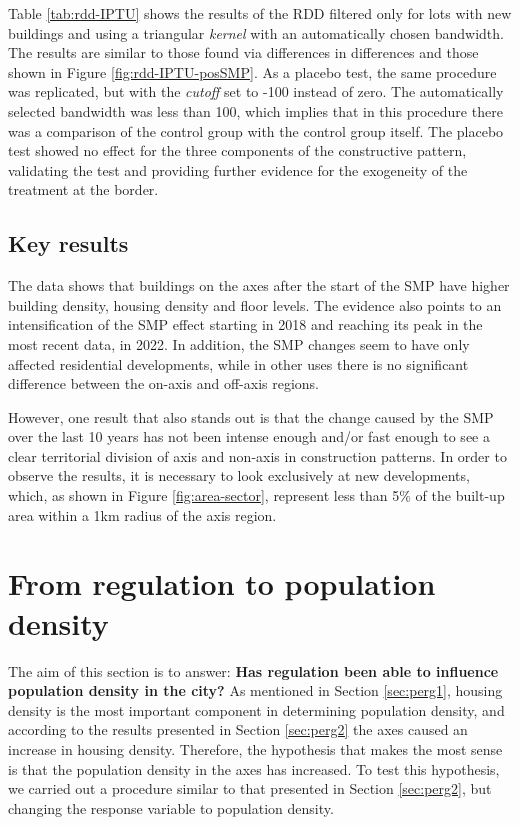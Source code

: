 



Table \ref{tab:rdd-IPTU} shows the results of the RDD filtered only for lots with new buildings and using a triangular \textit{kernel} with an automatically chosen bandwidth. The results are similar to those found via differences in differences and those shown in Figure \ref{fig:rdd-IPTU-posSMP}. As a placebo test, the same procedure was replicated, but with the \textit{cutoff} set to -100 instead of zero. The automatically selected bandwidth was less than 100, which implies that in this procedure there was a comparison of the control group with the control group itself. The placebo test showed no effect for the three components of the constructive pattern, validating the test and providing further evidence for the exogeneity of the treatment at the border.

\subsection{Key results}

The data shows that buildings on the axes after the start of the SMP have higher building density, housing density and floor levels. The evidence also points to an intensification of the SMP effect starting in 2018 and reaching its peak in the most recent data, in 2022. In addition, the SMP changes seem to have only affected residential developments, while in other uses there is no significant difference between the on-axis and off-axis regions.

However, one result that also stands out is that the change caused by the SMP over the last 10 years has not been intense enough and/or fast enough to see a clear territorial division of axis and non-axis in construction patterns. In order to observe the results, it is necessary to look exclusively at new developments, which, as shown in Figure \ref{fig:area-sector}, represent less than 5\% of the built-up area within a 1km radius of the axis region.

\clearpage
\section{From regulation to population density}
\label{sec:perg3}

The aim of this section is to answer: \textbf{Has regulation been able to influence population density in the city?} As mentioned in Section \ref{sec:perg1}, housing density is the most important component in determining population density, and according to the results presented in Section \ref{sec:perg2} the axes caused an increase in housing density. Therefore, the hypothesis that makes the most sense is that the population density in the axes has increased. To test this hypothesis, we carried out a procedure similar to that presented in Section \ref{sec:perg2}, but changing the response variable to population density.

